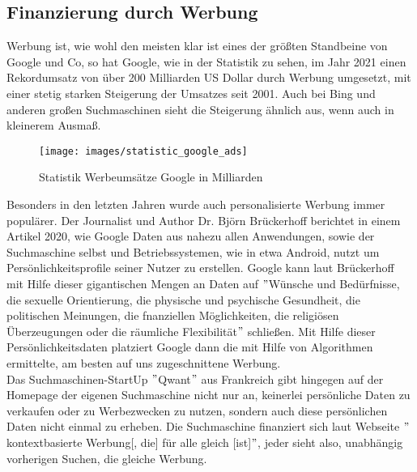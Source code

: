 \subsection{Finanzierung durch Werbung}\label{subsec:finanzierung-durch-werbung}
Werbung ist, wie wohl den meisten klar ist eines der größten Standbeine von Google und Co,
so hat Google, wie in der Statistik zu sehen, im Jahr 2021 einen Rekordumsatz von über 200 Milliarden US Dollar durch Werbung umgesetzt, mit einer stetig starken Steigerung der Umsatzes seit 2001.
Auch bei Bing und anderen großen Suchmaschinen sieht die Steigerung ähnlich aus, wenn auch in kleinerem Ausmaß.
\begin{figure}[h]
    \centering
    \texttt{[image: images/statistic\_google\_ads]}
    \caption{Statistik Werbeumsätze Google in Milliarden}
    \label{fig:statisticAdsGoogle}
\end{figure}
Besonders in den letzten Jahren wurde auch personalisierte Werbung immer populärer.
Der Journalist und Author Dr. Björn Brückerhoff berichtet in einem Artikel 2020, wie Google Daten aus nahezu allen Anwendungen, sowie der Suchmaschine selbst und Betriebssystemen, wie in etwa Android, nutzt um Persönlichkeitsprofile seiner Nutzer zu erstellen.
Google kann laut Brückerhoff mit Hilfe dieser gigantischen Mengen an Daten auf \("\)Wünsche und Bedürfnisse,
die sexuelle Orientierung, die physische und psychische Gesundheit, die politischen Meinungen, die fnanziellen Möglichkeiten, die religiösen Überzeugungen oder die räumliche Flexibilität\("\)\cite{BRK20} schließen.
Mit Hilfe dieser Persönlichkeitsdaten platziert Google dann die mit Hilfe von Algorithmen ermittelte,
am besten auf uns zugeschnittene Werbung.\cite{BRK20}\\

Das Suchmaschinen-StartUp \("\)Qwant\("\) aus Frankreich gibt hingegen auf der Homepage der eigenen Suchmaschine nicht nur an,
keinerlei persönliche Daten zu verkaufen oder zu Werbezwecken zu nutzen, sondern auch diese persönlichen Daten nicht einmal zu erheben.
Die Suchmaschine finanziert sich laut Webseite \("\)kontextbasierte Werbung[, die] für alle gleich [ist]\("\)\cite{QWA22},
jeder sieht also, unabhängig vorherigen Suchen, die gleiche Werbung.

